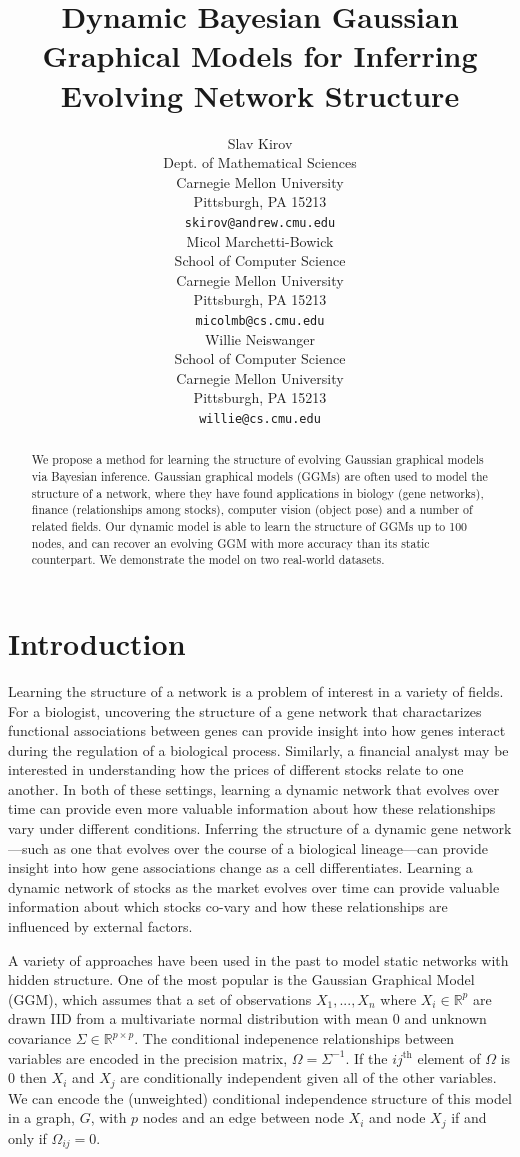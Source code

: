 \documentclass{article}
\title{Dynamic Bayesian Gaussian Graphical Models for Inferring Evolving Network Structure}
\author{ %
Slav Kirov\\
Dept. of Mathematical Sciences\\
Carnegie Mellon University\\
Pittsburgh, PA 15213 \\
\texttt{skirov@andrew.cmu.edu} \\
\And
Micol Marchetti-Bowick\\
School of Computer Science\\
Carnegie Mellon University\\
Pittsburgh, PA 15213 \\
\texttt{micolmb@cs.cmu.edu} \\
\And
Willie Neiswanger\\
School of Computer Science\\
Carnegie Mellon University\\
Pittsburgh, PA 15213 \\
\texttt{willie@cs.cmu.edu} \\
}
\begin{document}
\maketitle

\begin{abstract}
We propose a method for learning the structure of evolving Gaussian graphical models via Bayesian inference. Gaussian graphical models (GGMs) are often used to model the structure of a network, where they have found applications in biology (gene networks), finance (relationships among stocks), computer vision (object pose) and a number of related fields. Our dynamic model is able to learn the structure of GGMs up to 100 nodes, and can recover an evolving GGM with more accuracy than its static counterpart. We demonstrate the model on two real-world datasets.
\end{abstract}


\section{Introduction}
\label{sec:intro}

Learning the structure of a network is a problem of interest in a variety of fields. For a biologist, uncovering the structure of a gene network that charactarizes functional associations between genes can provide insight into how genes interact during the regulation of a biological process. 
Similarly, a financial analyst may be interested in understanding how the prices of different stocks relate to one another. 
In both of these settings, learning a dynamic network that evolves over time can provide even more valuable information about how these relationships vary under different conditions.
Inferring the structure of a dynamic gene network---such as one that evolves over the course of a biological lineage---can provide insight into how gene associations change as a cell differentiates. 
Learning a dynamic network of stocks as the market evolves over time can provide valuable information about which stocks co-vary and how these relationships are influenced by external factors.

A variety of approaches have been used in the past to model static networks with hidden structure. One of the most popular is the Gaussian Graphical Model (GGM), which assumes that a set of observations $X_1,...,X_n$ where $X_i \in \mathbb{R}^p$ are drawn IID from a multivariate normal distribution with mean $0$ and unknown covariance $\Sigma \in \mathbb{R}^{p \times p}$. The conditional indepenence relationships between variables are encoded in the precision matrix, $\Omega = \Sigma^{-1}$. If the ${ij}^{\text{th}}$ element of $\Omega$ is 0 then $X_i$ and $X_j$ are conditionally independent given all of the other variables. We can encode the (unweighted) conditional independence structure of this model in a graph, $G$, with $p$ nodes and an edge between node $X_i$ and node $X_j$ if and only if $\Omega_{ij} = 0$.
\end{document}
